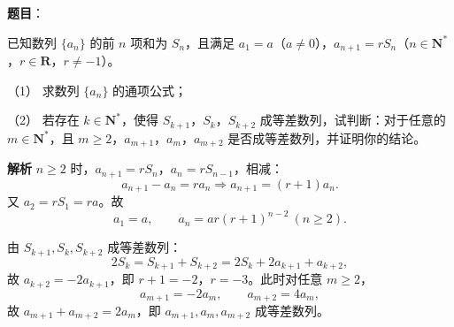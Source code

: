 \begin{answer}

\textbf{题目}：

已知数列 $\{a_n\}$ 的前 $n$ 项和为 $S_n$，且满足 $a_1=a$（$a\neq0$），$a_{n+1}=rS_n$（$n\in\mathbf N^*$，$r\in\mathbf R$，$r\neq-1$）。

（1） 求数列 $\{a_n\}$ 的通项公式；

（2） 若存在 $k\in\mathbf N^*$，使得 $S_{k+1}$，$S_k$，$S_{k+2}$ 成等差数列，试判断：对于任意的 $m\in\mathbf N^*$，且 $m\geqslant2$，$a_{m+1}$，$a_m$，$a_{m+2}$ 是否成等差数列，并证明你的结论。

\textbf{解析}
$n\geqslant2$ 时，$a_{n+1}=rS_n$，$a_n=rS_{n-1}$，相减：
\nopagebreak[4]
\[a_{n+1}-a_n=ra_n\Longrightarrow a_{n+1}=(r+1)a_n.\]
又 $a_2=rS_1=ra$。故
\nopagebreak[4]
\[a_1=a,\qquad a_n=ar(r+1)^{n-2}\ (n\geqslant2).\]

由 $S_{k+1},S_k,S_{k+2}$ 成等差数列：
\nopagebreak[4]
\[2S_k=S_{k+1}+S_{k+2}=2S_k+2a_{k+1}+a_{k+2},\]
故 $a_{k+2}=-2a_{k+1}$，即 $r+1=-2$，$r=-3$。此时对任意 $m\geqslant2$，
\nopagebreak[4]
\[a_{m+1}=-2a_m,\qquad a_{m+2}=4a_m,\]
故 $a_{m+1}+a_{m+2}=2a_m$，即 $a_{m+1},a_m,a_{m+2}$ 成等差数列。



\end{answer}
